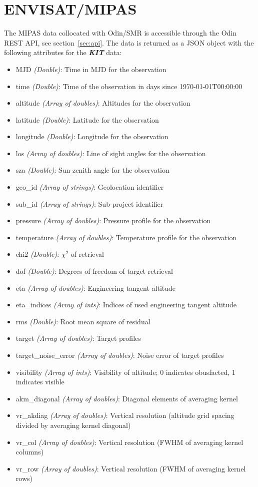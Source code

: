 \section{ENVISAT/MIPAS}
The MIPAS data collocated with Odin/SMR is accessible through the Odin REST
API, see section~\ref{sec:api}. The data is returned as a JSON object with the
following attributes for the \textbf{\emph{KIT}} data:
\begin{itemize}
    \item MJD \emph{(Double)}: Time in MJD for the observation
    \item time \emph{(Double)}: Time of the observation in days since
        1970-01-01T00:00:00
    \item altitude \emph{(Array of doubles)}: Altitudes for the observation
    \item latitude \emph{(Double)}: Latitude for the observation
    \item longitude \emph{(Double)}: Longitude for the observation
    \item los \emph{(Array of doubles)}: Line of sight angles for the
        observation
    \item sza \emph{(Double)}: Sun zenith angle for the observation
    \item geo\_id \emph{(Array of strings)}: Geolocation identifier
    \item sub\_id \emph{(Array of strings)}: Sub-project identifier
    \item pressure \emph{(Array of doubles)}: Pressure profile for the
        observation
    \item temperature \emph{(Array of doubles)}: Temperature profile for the
        observation
    \item chi2 \emph{(Double)}: $\chi^2$ of retrieval
    \item dof \emph{(Double)}: Degrees of freedom of target retrieval
    \item eta \emph{(Array of doubles)}: Engineering tangent altitude
    \item eta\_indices \emph{(Array of ints)}: Indices of used engineering
        tangent altitude
    \item rms \emph{(Double)}: Root mean square of residual
    \item target \emph{(Array of doubles)}: Target profiles
    \item target\_noise\_error \emph{(Array of doubles)}: Noise error of target
        profiles
    \item visibility \emph{(Array of ints)}: Visibility of altitude;
        0 indicates obusfacted, 1 indicates visible
    \item akm\_diagonal \emph{(Array of doubles)}: Diagonal elements of
        averaging kernel
    \item vr\_akdiag \emph{(Array of doubles)}: Vertical resolution (altitude
        grid spacing divided by averaging kernel diagonal)
    \item vr\_col \emph{(Array of doubles)}: Vertical resolution (FWHM of
        averaging kernel columns)
    \item vr\_row \emph{(Array of doubles)}: Vertical resolution (FWHM of
        averaging kernel rows)
\end{itemize}
